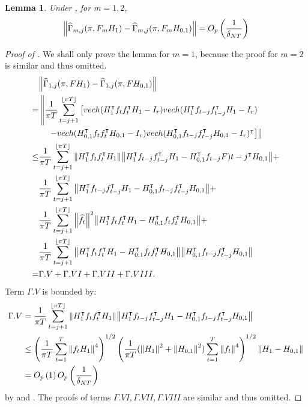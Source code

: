 \documentclass[12pt]{article}
\newtheorem{lemma}{Lemma}
\newcommand*{\tran}{\intercal}
\theoremstyle{plain}
\numberwithin{equation}{section}
\begin{document}
\begin{lemma}
\label{lem:Z_gamma_consistency:2}
Under , for $m = 1, 2$,
\begin{align*}
\norm{\widehat{\Gamma}_{m, j}(\pi, F_m H_1) - \widehat{\Gamma}_{m, j}(\pi, F_m H_{0, 1})} = O_p\left( \frac{1}{\delta_{NT}}\right)
\end{align*}
\end{lemma}
\begin{proof}[Proof of ]
We shall only prove the lemma for $m = 1$, because the proof for $m = 2$ is similar and thus omitted.
\begin{align*}
&\norm{\widehat{\Gamma}_{1, j}(\pi, FH_1) - \widehat{\Gamma}_{1, j}(\pi, FH_{0, 1})} \\
= &\left\lVert
	\frac{1}{\pi T} \sum_{t = j + 1}^{\floor{\pi T}} 
	\left[ vech(H_1^\tran f_t f_t^\tran H_1 - I_r)
		vech(H_1^\tran f_{t - j} f_{t - j}^\tran H_1 - I_r)
	\right. \right. \\
&\quad \left. \left. -
	vech(H_{0, 1}^\tran f_t f_t^\tran H_{0, 1} - I_r)
	vech(H_{0, 1}^\tran f_{t - j} f_{t - j}^\tran H_{0, 1} - I_r)^\tran \right] 
\right\rVert \\
\leq 
&\frac{1}{\pi T} \sum_{t = j + 1}^{\floor{\pi T}} 
	\norm{
		H_1^\tran f_t f_t^\tran H_1
		}
	\norm{
		H_1^\tran f_{t - j} f_{t - j}^\tran H_1 - 
		H_{0, 1}^\tran f_{t - j} F){t - j}^\tran H_{0, 1}
		} + \\
&\frac{1}{\pi T} \sum_{t = j + 1}^{\floor{\pi T}} 
	\norm{
		H_1^\tran f_{t - j} f_{t - j}^\tran H_1 - 
		H_{0, 1}^\tran f_{t - j} f_{t - j}^\tran H_{0, 1}
		} + \\
&\frac{1}{\pi T} \sum_{t = j + 1}^{\floor{\pi T}} 
	\norm{
		\widehat{f}_t
		}^2
	\norm{
		H_1^\tran f_{t} f_{t}^\tran H_1 - 
				H_{0, 1}^\tran f_{t} f_{t}^\tran H_{0, 1}
		} + \\		
&\frac{1}{\pi T} \sum_{t = j + 1}^{\floor{\pi T}} 
	\norm{
		H_1^\tran f_{t} f_{t}^\tran H_1 - 
						H_{0, 1}^\tran f_{t} f_{t}^\tran H_{0, 1}
		}
	\norm{
		H_{0, 1}^\tran f_{t - j} f_{t - j}^\tran H_{0, 1}
		} \\
= &\Gamma.V + \Gamma.VI + \Gamma.VII + \Gamma.VIII.
\end{align*}
Term $\Gamma.V$ is bounded by:
\begin{align*}
\Gamma.V &= 
\frac{1}{\pi T} \sum_{t = j + 1}^{\floor{\pi T}} 
	\norm{
		H_1^\tran f_t f_t^\tran H_1
		}
	\norm{
		H_1^\tran f_{t - j} f_{t - j}^\tran H_1 - 
		H_{0, 1}^\tran f_{t - j} f_{t - j}^\tran H_{0, 1}
		} \\
&\leq 
\left( 
	\frac{1}{\pi T} \sumT 
	\norm{f_t H_1}^4
\right)^{1/2}
\left( 
	\frac{1}{\pi T} 
	(\norm{H_1}^2 + \norm{H_{0, 1}}^2)
	\sumT 
	\norm{f_t}^4
\right)^{1/2}
\norm{H_1 - H_{0, 1}} \\
&= \Op{1} \Opdelta
\end{align*}
by  and . The proofs of terms $\Gamma.VI, \Gamma.VII, \Gamma.VIII$ are similar and thus omitted.
\end{proof}
\end{document}
